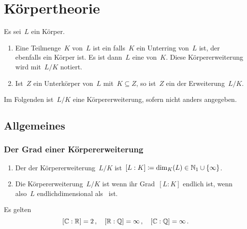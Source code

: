 \chapter{Körpertheorie}

\begin{definition}
  Es sei~$L$ ein Körper.
  \begin{enumerate}
    \item
      Eine Teilmenge~$K$ von~$L$ ist ein  falls~$K$ ein Unterring von~$L$ ist, der ebenfalls ein Körper ist.
      Es ist dann~$L$ eine  von~$K$.
      Diese Körpererweiterung wird mit~$L/K$ notiert.
    \item
      Ist~$Z$ ein Unterkörper von~$L$ mit~$K \subseteq Z$, so ist~$Z$ ein  der Erweiterung~$L/K$.
  \end{enumerate}
\end{definition}

\begin{convention}
  Im Folgenden ist~$L/K$ eine Körpererweiterung, sofern nicht anders angegeben.
\end{convention}





\section{Allgemeines}



\subsection{Der Grad einer Körpererweiterung}

\begin{definition}
  \leavevmode
  \begin{enumerate}
    \item
      Der  der Körpererweiterung~$L/K$ ist~$[L : K] \coloneqq \dim_K(L) \in \mathbb{N}_1 \cup \{ \infty \}$.
    \item
      Die Körpererweiterung~$L/K$ ist  wenn ihr Grad~$[L : K]$ endlich ist, wenn also~$L$ endlichdimensional als~ ist.
  \end{enumerate}
\end{definition}

\begin{example}
  Es gelten
  \[
    [\mathbb{C} : \mathbb{R}] = 2 \,,
    \quad
    [\mathbb{R} : \mathbb{Q}] = \infty \,,
    \quad
    [\mathbb{C} : \mathbb{Q}] = \infty \,.
  \]
\end{example}

